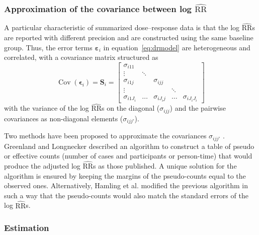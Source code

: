 \documentclass[11pt,a4paper,twoside,openany]{book}\usepackage{knitr}
\DeclareMathOperator{\Cov}{Cov}
\begin{document}
{\subsubsection*{Approximation of the covariance between log $\widehat{\mathrm{RR}}$}\label{sec:cov}

\noindent A particular characteristic of summarized dose--response data is that the log $\widehat{\mathrm{RR}}$s are reported with different precision and are constructed using the same baseline group. Thus, the error terms $\boldsymbol{\varepsilon}_i$ in equation~\ref{eq:drmodel} are heterogeneous and correlated, with a covariance matrix structured as
\begin{equation}
\Cov\left(\boldsymbol{\epsilon}_i\right) = \mathbf{S}_i = \left[
\begin{array}{ccccc}
\sigma_{i11} & \ \ & \ & & \ \\
\vdots \ & \ddots & & & \ \\
\sigma_{i1j}& \ & \sigma_{ijj}& & \ \\
\vdots & \ & \ & \ddots & \\
\sigma_{i1J_i} & \ldots & \sigma_{iJ_ij} & \ldots & \sigma_{iJ_iJ_i}
\end{array}
\right] 
\label{eq:S_i}
\end{equation}
\noindent with the variance of the log $\widehat{\mathrm{RR}}$s on the diagonal ($\sigma_{ijj}$) and the pairwise covariances as non-diagonal elements ($\sigma_{ijj'}$).

Two methods have been proposed to approximate the covariances $\sigma_{ijj'}$ \citep{greenland1992methods, hamling2008facilitating}. Greenland and Longnecker described an algorithm to construct a table of pseudo or effective counts (number of cases and participants or person-time) that would produce the adjusted log $\widehat{\mathrm{RR}}$s as those published. A unique solution for the algorithm is ensured by keeping the margins of the pseudo-counts equal to the observed ones. Alternatively, Hamling et al. modified the previous algorithm in such a way that the pseudo-counts would also match the standard errors of the log $\widehat{\mathrm{RR}}$s. 

\subsubsection*{Estimation}

}
\end{document}
